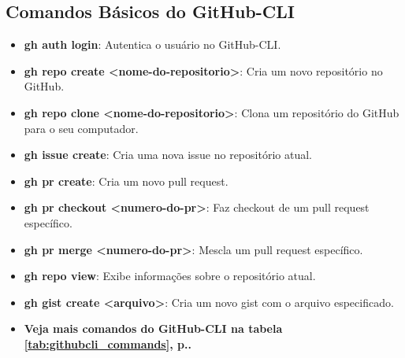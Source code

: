 \subsection{Comandos Básicos do GitHub-CLI}
\begin{itemize}
  \item \textbf{gh auth login}: Autentica o usuário no GitHub-CLI.
  \item \textbf{gh repo create <nome-do-repositorio>}: Cria um novo repositório no GitHub.
  \item \textbf{gh repo clone <nome-do-repositorio>}: Clona um repositório do GitHub para o seu computador.
  \item \textbf{gh issue create}: Cria uma nova issue no repositório atual.
  \item \textbf{gh pr create}: Cria um novo pull request.
  \item \textbf{gh pr checkout <numero-do-pr>}: Faz checkout de um pull request específico.
  \item \textbf{gh pr merge <numero-do-pr>}: Mescla um pull request específico.
  \item \textbf{gh repo view}: Exibe informações sobre o repositório atual.
  \item \textbf{gh gist create <arquivo>}: Cria um novo gist com o arquivo especificado.
  \item \textbf{Veja mais comandos do GitHub-CLI na tabela \ref{tab:githubcli_commands}, p.\pageref{tab:githubcli_commands}.}
\end{itemize}
\par